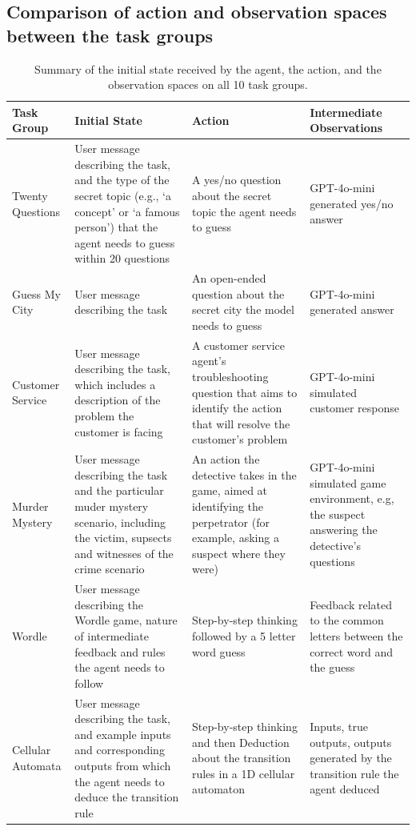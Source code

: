 \newpage 

\subsection{Comparison of action and observation spaces between the task groups}

\begin{table}[h!]
\caption{Summary of the initial state received by the agent, the action, and the observation spaces on all 10 task groups. }
\label{tab:task_group_observation_spaces}
\centering
\begin{tabular}{|l|p{4cm}|p{4cm}|p{4cm}|}
\hline
\textbf{Task Group} & \textbf{Initial State} & \textbf{Action} & \textbf{Intermediate Observations} \\
\hline
Twenty Questions & User message describing the task, and the type of the secret topic (e.g., `a concept' or `a famous person') that the agent needs to guess within 20 questions & A yes/no question about the secret topic the agent needs to guess & GPT-4o-mini generated yes/no answer \\
\hline
Guess My City & User message describing the task & An open-ended question about the secret city the model needs to guess & GPT-4o-mini generated answer \\
\hline
Customer Service & User message describing the task, which includes a description of the problem the customer is facing & A customer service agent’s troubleshooting question that aims to identify the action that will resolve the customer's problem & GPT-4o-mini simulated customer response \\
\hline
Murder Mystery & User message describing the task and the particular muder mystery scenario, including the victim, supsects and witnesses of the crime scenario & An action the detective takes in the game, aimed at identifying the perpetrator (for example, asking a suspect where they were) & GPT-4o-mini simulated game environment, e.g, the suspect answering the detective's questions \\
\hline
Wordle & User message describing the Wordle game, nature of intermediate feedback and rules the agent needs to follow & Step-by-step thinking followed by a 5 letter word guess & Feedback related to the common letters between the correct word and the guess \\
\hline
Cellular Automata & User message describing the task, and example inputs and corresponding outputs from which the agent needs to deduce the transition rule & Step-by-step thinking and then Deduction about the transition rules in a 1D cellular automaton & Inputs, true outputs, outputs generated by the transition rule the agent deduced \\

\end{tabular}
\end{table}
